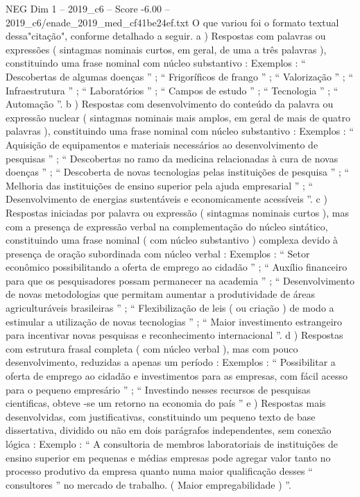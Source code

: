 \begin{textsample}{NEG Dim 1 – 2019\_c6 – Score -6.00 – 2019\_c6/enade\_2019\_med\_cf41be24ef.txt}
O que variou foi o formato textual dessa"citação", conforme detalhado a seguir. a ) Respostas com palavras ou expressões ( sintagmas nominais curtos, em geral, de uma a três palavras ), constituindo uma frase nominal com núcleo substantivo : Exemplos : “ Descobertas de algumas doenças ” ; “ Frigoríficos de frango ” ; “ Valorização ” ; “ Infraestrutura ” ; “ Laboratórios ” ; “ Campos de estudo ” ; “ Tecnologia ” ; “ Automação ”. b ) Respostas com desenvolvimento do conteúdo da palavra ou expressão nuclear ( sintagmas nominais mais amplos, em geral de mais de quatro palavras ), constituindo uma frase nominal com núcleo substantivo : Exemplos : “ Aquisição de equipamentos e materiais necessários ao desenvolvimento de pesquisas ” ; “ Descobertas no ramo da medicina relacionadas à cura de novas doenças ” ; “ Descoberta de novas tecnologias pelas instituições de pesquisa ” ; “ Melhoria das instituições de ensino superior pela ajuda empresarial ” ; “ Desenvolvimento de energias sustentáveis e economicamente acessíveis ”. c ) Respostas iniciadas por palavra ou expressão ( sintagmas nominais curtos ), mas com a presença de expressão verbal na complementação do núcleo sintático, constituindo uma frase nominal ( com núcleo substantivo ) complexa devido à presença de oração subordinada com núcleo verbal : Exemplos : “ Setor econômico possibilitando a oferta de emprego ao cidadão ” ; “ Auxílio financeiro para que os pesquisadores possam permanecer na academia ” ; “ Desenvolvimento de novas metodologias que permitam aumentar a produtividade de áreas agriculturáveis brasileiras ” ; “ Flexibilização de leis ( ou criação ) de modo a estimular a utilização de novas tecnologias ” ; “ Maior investimento estrangeiro para incentivar novas pesquisas e reconhecimento internacional ”. d ) Respostas com estrutura frasal completa ( com núcleo verbal ), mas com pouco desenvolvimento, reduzidas a apenas um período : Exemplos : “ Possibilitar a oferta de emprego ao cidadão e investimentos para as empresas, com fácil acesso para o pequeno empresário ” ; “ Investindo nesses recursos de pesquisas cientificas, obteve -se um retorno na economia do país ” e ) Respostas mais desenvolvidas, com justificativas, constituindo um pequeno texto de base dissertativa, dividido ou não em dois parágrafos independentes, sem conexão lógica : Exemplo : “ A consultoria de membros laboratoriais de instituições de ensino superior em pequenas e médias empresas pode agregar valor tanto no processo produtivo da empresa quanto numa maior qualificação desses “ consultores ” no mercado de trabalho. ( Maior empregabilidade ) ”.

\end{textsample}
